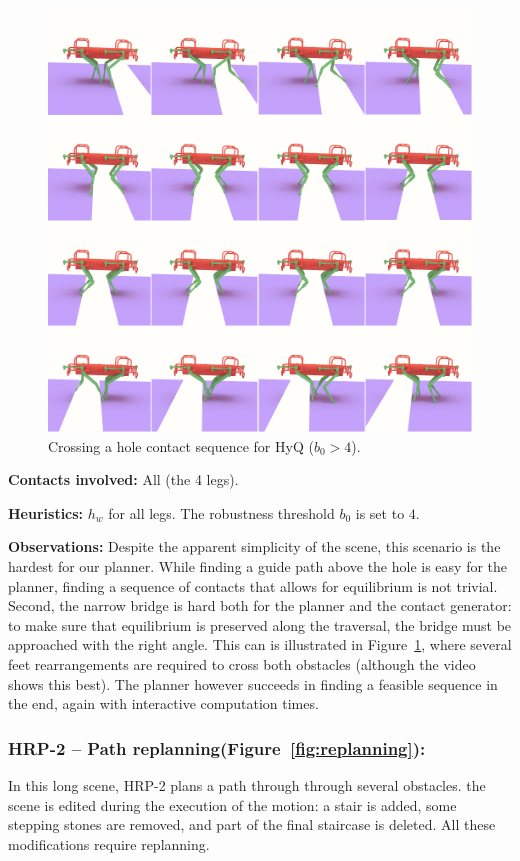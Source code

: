 \begin{figure}
  \centering
  \includegraphics[width=0.5\linewidth]{figures/hyq_obs}
  \caption{
           Crossing a hole contact sequence for HyQ ($b_0 > 4$). }
		   \label{fig:hyq_obs}
\end{figure}



\noindent\textbf{Contacts involved:} All (the 4 legs).

\noindent\textbf{Heuristics:} $h_w$ for all legs. The robustness threshold $b_0$ is set to $4$.

\noindent\textbf{Observations:} Despite the apparent simplicity of the scene, this scenario is the hardest for our planner.
While finding a guide path above the hole is easy for the planner, finding a sequence of contacts that allows for equilibrium is not trivial.
Second, the narrow bridge is hard both for the planner and the contact generator: to make sure that equilibrium is preserved along the traversal,
the bridge must be approached with the right angle.
This can is illustrated in Figure~\ref{fig:hyq_obs}, where several feet rearrangements are required to cross both obstacles (although the video shows this best).
The planner however succeeds in finding a feasible sequence in the end, again with interactive computation times.

\subsubsection{HRP-2 -- Path replanning(Figure~\ref{fig:replanning}):}
In this long scene, HRP-2 plans a path through through several obstacles. the scene is edited during the execution of the motion: a stair is added,
some stepping stones are removed, and part of the final staircase is deleted. All these modifications require replanning.


